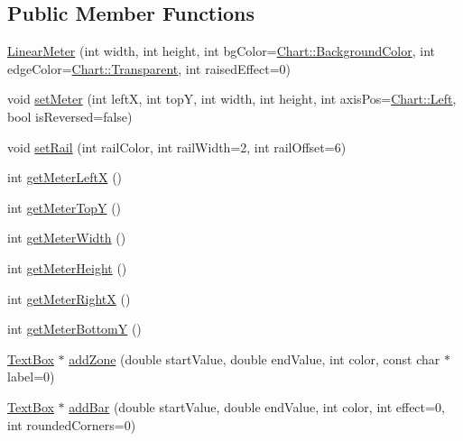 \subsection*{Public Member Functions}
\begin{DoxyCompactItemize}
\item 
\hyperlink{class_linear_meter_a7a87e1ea118e2b8dfddb06b9622a7d80}{Linear\+Meter} (int width, int height, int bg\+Color=\hyperlink{namespace_chart_abee0d882fdc9ad0b001245ad9fc64011a134193bde693b9d152d0c6dc59fa7d7f}{Chart\+::\+Background\+Color}, int edge\+Color=\hyperlink{namespace_chart_abee0d882fdc9ad0b001245ad9fc64011afc6811800a9e2582dac0157b6279f836}{Chart\+::\+Transparent}, int raised\+Effect=0)
\item 
void \hyperlink{class_linear_meter_a5c371b61604befc3d3459175740704af}{set\+Meter} (int leftX, int topY, int width, int height, int axis\+Pos=\hyperlink{namespace_chart_ae222e51ce11a254450b6ddfbc862680aae213f3cd1461b109f9aa955d28ed4418}{Chart\+::\+Left}, bool is\+Reversed=false)
\item 
void \hyperlink{class_linear_meter_a3ea47754984830027c4f543f23226748}{set\+Rail} (int rail\+Color, int rail\+Width=2, int rail\+Offset=6)
\item 
int \hyperlink{class_linear_meter_ab75f2dce6013211e5a241a13205263ef}{get\+Meter\+LeftX} ()
\item 
int \hyperlink{class_linear_meter_a9122149ef99dd2abc325af75f8f4e284}{get\+Meter\+TopY} ()
\item 
int \hyperlink{class_linear_meter_a52152c56dc40d25788a0538102677f4a}{get\+Meter\+Width} ()
\item 
int \hyperlink{class_linear_meter_a0512eb92ecebcc8fa768ae61b9f2bd89}{get\+Meter\+Height} ()
\item 
int \hyperlink{class_linear_meter_a78ffbad85d01ed2fde40342f49901288}{get\+Meter\+RightX} ()
\item 
int \hyperlink{class_linear_meter_a75d8fef2615264355a45101a42c23298}{get\+Meter\+BottomY} ()
\item 
\hyperlink{class_text_box}{Text\+Box} $\ast$ \hyperlink{class_linear_meter_adf04c08cb83e4f3d71ed056fcafff552}{add\+Zone} (double start\+Value, double end\+Value, int color, const char $\ast$label=0)
\item 
\hyperlink{class_text_box}{Text\+Box} $\ast$ \hyperlink{class_linear_meter_ae2cab5aaf926542c2856a4b8995bd051}{add\+Bar} (double start\+Value, double end\+Value, int color, int effect=0, int rounded\+Corners=0)
\end{DoxyCompactItemize}
